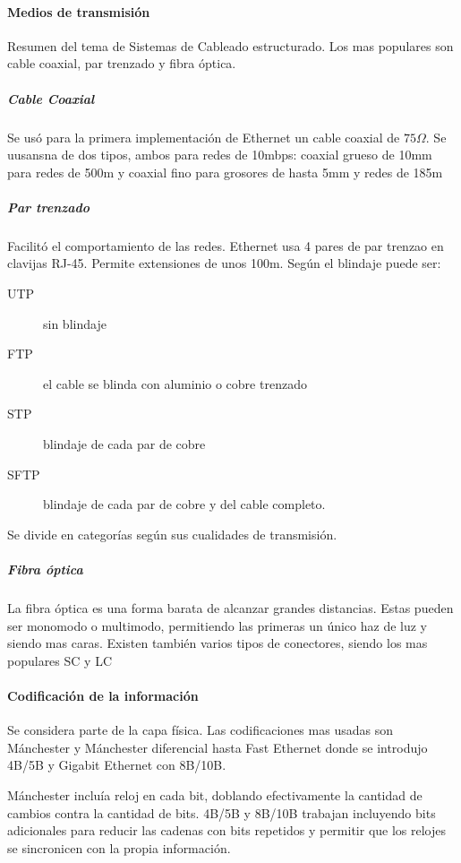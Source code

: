         \paragraph{Medios de transmisión} %
            Resumen del tema de Sistemas de Cableado estructurado. Los mas populares son cable coaxial, par trenzado y fibra óptica.

            \subparagraph{Cable Coaxial} %
                Se usó para la primera implementación de Ethernet un cable coaxial de $75\Omega$. Se uusansna de dos tipos, ambos para redes de 10mbps: coaxial grueso de 10mm para redes de 500m y coaxial fino para grosores de hasta 5mm y redes de 185m

            \subparagraph{Par trenzado} %
                Facilitó el comportamiento de las redes. Ethernet usa 4 pares de par trenzao en clavijas RJ-45. Permite extensiones de unos 100m. Según el blindaje puede ser:
                \begin{description}
                    \item[UTP] sin blindaje
                    \item[FTP] el cable se blinda con aluminio o cobre trenzado
                    \item[STP] blindaje de cada par de cobre
                    \item[SFTP] blindaje de cada par de cobre y del cable completo.
                \end{description}
                Se divide en categorías según sus cualidades de transmisión.

            \subparagraph{Fibra óptica} %
                La fibra óptica es una forma barata de alcanzar grandes distancias. Estas pueden ser monomodo o multimodo, permitiendo las primeras un único haz de luz y siendo mas caras. Existen también varios tipos de conectores, siendo los mas populares SC y LC

        \paragraph{Codificación de la información} %
            Se considera parte de la capa física. Las codificaciones mas usadas son Mánchester y Mánchester diferencial hasta Fast Ethernet donde se introdujo 4B/5B y Gigabit Ethernet con 8B/10B.

            Mánchester incluía reloj en cada bit, doblando efectivamente la cantidad de cambios contra la cantidad de bits. 4B/5B y 8B/10B trabajan incluyendo bits adicionales para reducir las cadenas con bits repetidos y permitir que los relojes se sincronicen con la propia información.

